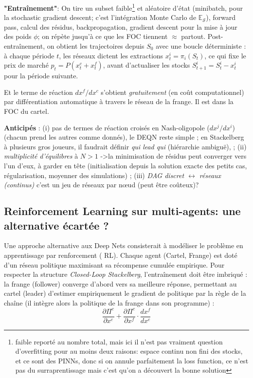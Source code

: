 \documentclass[11pt]{article}
\begin{document}
\textbf{"Entraînement"}: On tire un subset faible\footnote{faible reporté au nombre total, mais ici il n'est pas vraiment question d'overfitting pour au moins deux raisons: espace continu non fini des stocks, et ce sont des PINNs, donc si on annule parfaitement la loss function, ce n'est pas du surraprentissage mais c'est qu'on a découvert la bonne solution} et aléatoire d'état (minibatch, pour la stochastic gradient descent; c'est l'intégration Monte Carlo de $\mathbb{E}_{\mathcal{S}}$), forward pass, calcul des résidus, backpropagation, gradient descent pour la mise à jour des poids $\phi$; on répète jusqu'à ce
que les FOC tiennent $\approx$ partout. Post-entraînement, on obtient les trajectoires depuis $S_0$ avec une boucle déterministe : à chaque période $t$, les réseaux dictent les extractions $x^i_t = \pi_i(S_t)$, ce qui fixe le prix de marché $p_t = P(x^c_t + x^f_t)$, avant d'actualiser les stocks $S^i_{t+1} = S^i_t - x^i_t$ pour la période suivante.

Et le terme de réaction $dx^f/d x^c$ s'obtient
\textit{gratuitement} (en coût computationnel) par différentiation automatique à travers le réseau de la frange. Il est dans la FOC du cartel. 

\textbf{Anticipés} : (i) pas de termes de réaction croisés en Nash-oligopole ($dx^j/dx^i$) (chacun prend les autres comme donnés), le DEQN reste simple ; en Stackelberg à plusieurs gros joueurs, il faudrait définir \emph{qui lead qui} (hiérarchie ambigu\"e), ; (ii) \emph{multiplicité d'équilibres} à $N>1$ ->la minimisation de résidus peut converger vers l'un d'eux, à garder en tête (initialisation depuis la solution exacte des petits cas, régularisation, moyenner des simulations) ; (iii) \emph{DAG discret $\leftrightarrow$ réseaux (continus)} c'est un jeu de réseaux par n\oe ud (peut être co\^uteux)?

\subsection{ Reinforcement Learning sur multi-agents: une alternative écartée ? }
\label{sec:B}

Une approche alternative aux Deep Nets consisterait à modéliser le problème en apprentissage par renforcement ( RL). Chaque agent (Cartel, Frange) est doté d'un réseau politique maximisant sa récompense cumulée empirique. Pour respecter la structure \emph{Closed-Loop Stackelberg}, l'entraînement doit être imbriqué : la frange (follower) converge d'abord vers sa meilleure réponse, permettant au cartel (leader) d'estimer empiriquement le gradient de politique par la règle de la chaîne (il intègre alors la politique de la frange dans son programme) :
\[
\frac{\partial\Pi^c}{\partial x^c} + \frac{\partial\Pi^c}{\partial x^f} \cdot \frac{dx^f}{dx^c}
\]
\end{document}
